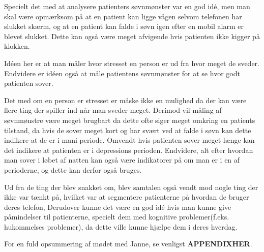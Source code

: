 \begin{description}[style=nextline]
	Specielt det med at analysere patienters søvnmønster var en god idé, men man skal være opmærksom på at en patient kan ligge vågen selvom telefonen har slukket skærm, og at en patient kan falde i søvn igen efter en mobil alarm er blevet slukket.
	Dette kan også være meget afvigende hvis patienten ikke kigger på klokken.
\item[Galvanisk hud respons]
	Idéen her er at man måler hvor stresset en person er ud fra hvor meget de sveder. 
	Endvidere er idéen også at måle patientens søvnmønster for at se hvor godt patienten sover.
	
	Det med om en person er stresset er måske ikke en mulighed da der kan være flere ting der spiller ind når man sveder meget.
	Derimod vil måling af søvnmønstre være meget brugbart da dette ofte siger meget omkring en patients tilstand, da hvis de sover meget kort og har svært ved at falde i søvn kan dette indikere at de er i mani periode.
	Omvendt hvis patienten sover meget længe kan det indikere at patienten er i depressions perioden.
	Endvidere, alt efter hvordan man sover i løbet af natten kan også være indikatorer på om man er i en af perioderne, og dette kan derfor også bruges. 
\item[Andre]
	Ud fra de ting der blev snakket om, blev samtalen også vendt mod nogle ting der ikke var tænkt på, hvilket var at segmentere patienterne på hvordan de bruger deres telefon, 
	Derudover kunne det være en god idé hvis man kunne give påmindelser til patienterne, specielt dem med kognitive problemer(f.eks. hukommelses problemer), da dette ville kunne hjælpe dem i deres hverdag.
\end{description}

For en fuld opsummering af mødet med Janne, se venligst \textbf{APPENDIXHER}.